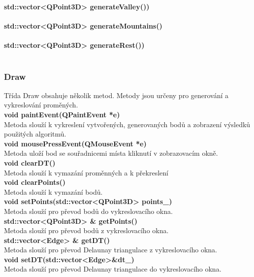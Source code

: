 \documentclass[a4paper, 12pt]{article}
\begin{document}
\textbf{std::vector<QPoint3D> generateValley())}\\
\\

\textbf{std::vector<QPoint3D> generateMountains()}\\
\\

\textbf{std::vector<QPoint3D> generateRest())}\\
\\

\subsubsection{Draw}
Třída Draw obsahuje několik metod. Metody jsou určeny pro generování a vykreslování proměných.
\\

\textbf{void paintEvent(QPaintEvent *e)}\\
Metoda slouží k vykreslení vytvořených, generovaných bodů a zobrazení výsledků použitých algoritmů.
\\

\textbf{void mousePressEvent(QMouseEvent *e)}\\
Metoda uloží bod se souřadnicemi místa kliknutí v zobrazovacím okně.
\\

\textbf{void clearDT()}\\
Metoda slouží k vymazání proměnných a k překreslení
\\

\textbf{void clearPoints()}\\
Metoda slouží k vymazání bodů.
\\

\textbf{void setPoints(std::vector<QPoint3D> points\_)}\\
Metoda slouží pro převod bodů do vykreslovacího okna.\\

\textbf{std::vector<QPoint3D> \& getPoints()}\\
Metoda slouží pro převod bodů z vykreslovacího okna.\\

\textbf{std::vector<Edge> \& getDT()}\\
Metoda slouží pro převod Delaunay triangulace z vykreslovacího okna.\\

\textbf{void setDT(std::vector<Edge>\&dt\_)}\\
Metoda slouží pro převod Delaunay triangulace do vykreslovacího okna.\\
\end{document}
